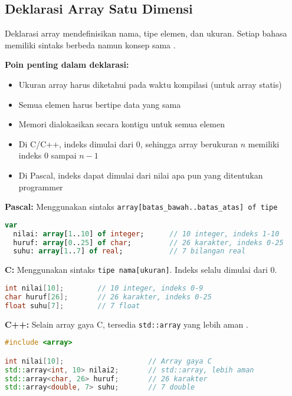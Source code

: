\documentclass[../main.tex]{subfiles}
\begin{document}
\subsection{Deklarasi Array Satu Dimensi}
Deklarasi array mendefinisikan nama, tipe elemen, dan ukuran. Setiap bahasa memiliki sintaks berbeda namun konsep sama \parencite{tutorialspoint-c-arrays,learncpp-arrays,free-pascal-docs,tutorialpemrograman-array-c}.

\textbf{Poin penting dalam deklarasi:}
\begin{itemize}
  \item Ukuran array harus diketahui pada waktu kompilasi (untuk array statis)
  \item Semua elemen harus bertipe data yang sama
  \item Memori dialokasikan secara kontigu untuk semua elemen
  \item Di C/C++, indeks dimulai dari 0, sehingga array berukuran $n$ memiliki indeks 0 sampai $n-1$
  \item Di Pascal, indeks dapat dimulai dari nilai apa pun yang ditentukan programmer
\end{itemize}

\textbf{Pascal:} Menggunakan sintaks \texttt{array[batas\_bawah..batas\_atas] of tipe}
\begin{lstlisting}[language=Pascal, caption={Deklarasi array di Pascal}]
var
  nilai: array[1..10] of integer;      // 10 integer, indeks 1-10
  huruf: array[0..25] of char;         // 26 karakter, indeks 0-25
  suhu: array[1..7] of real;           // 7 bilangan real
\end{lstlisting}

\textbf{C:} Menggunakan sintaks \texttt{tipe nama[ukuran]}. Indeks selalu dimulai dari 0.
\begin{lstlisting}[language=C, caption={Deklarasi array di C}]
int nilai[10];        // 10 integer, indeks 0-9
char huruf[26];       // 26 karakter, indeks 0-25
float suhu[7];        // 7 float
\end{lstlisting}

\textbf{C++:} Selain array gaya C, tersedia \texttt{std::array} yang lebih aman \parencite{cpp-std-array,cppreference-array}.
\begin{lstlisting}[language=C++, caption={Deklarasi array di C++}]
#include <array>

int nilai[10];                    // Array gaya C
std::array<int, 10> nilai2;       // std::array, lebih aman
std::array<char, 26> huruf;       // 26 karakter
std::array<double, 7> suhu;       // 7 double
\end{lstlisting}
\end{document}
